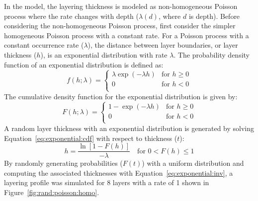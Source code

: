 \documentclass[11pt]{report}
\begin{document}
In the \citet{toro:95} model, the layering thickness is modeled as non-homogeneous Poisson process
where the rate changes with depth ($\lambda(d)$, where $d$ is depth).  Before considering the
non-homogeneous Poisson process, first consider the simpler homogeneous Poisson process with a
constant rate.  For a Poisson process with a constant occurrence rate ($\lambda$), the distance
between layer boundaries, or layer thickness ($h$), is an exponential distribution with rate
$\lambda$.  The probability density function of an exponential distribution is defined as:
\begin{equation}
  f(h;\lambda) = 
  \left\{
  \begin{array}{ll}
	\lambda \exp(-\lambda h) & \text{for } h \ge 0 \\
	0 & \text{for } h < 0 \\
  \end{array}
  \right.
  \label{eq:exponential:pdf}
\end{equation}
The cumulative density function for the exponential distribution is given by:
\begin{equation}
  F(h;\lambda) = 
  \left\{
  \begin{array}{ll}
	1- \exp(-\lambda h) & \text{for } h \ge 0 \\
	0 & \text{for } h < 0 \\
  \end{array}
  \right.
  \label{eq:exponential:cdf}
\end{equation}
A random layer thickness with an exponential distribution is generated by solving
Equation~\ref{eq:exponential:cdf} with respect to thickness ($t$):
\begin{equation}
  h = \frac{\ln\left[1-F(h)\right]}{-\lambda} \quad \text{for } 0 < F(h) \le 1
  \label{eq:exponential:inv}
\end{equation}
By randomly generating probabilities ($F(t)$) with a uniform distribution and computing the
associated thicknesses with Equation~\ref{eq:exponential:inv}, a layering profile was simulated for
8 layers with a rate of 1 shown in Figure~\ref{fig:rand:poisson:homo}.
\end{document}
